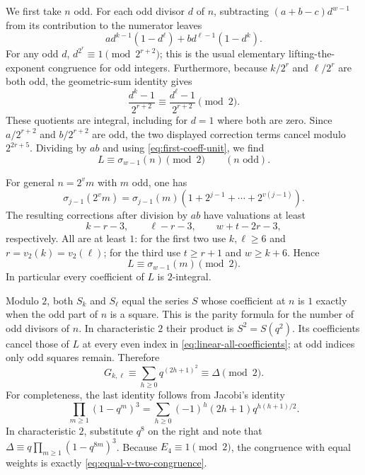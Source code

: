 \documentclass[11pt]{article}
\begin{document}
We first take $n$ odd.  For each odd divisor $d$ of $n$,
subtracting $(a+b-c)d^{w-1}$ from its contribution to the numerator
leaves
\[
 a d^{k-1}(1-d^\ell)+b d^{\ell-1}(1-d^k).
\]
For any odd $d$, $d^{2^r}\equiv1\pmod{2^{r+2}}$; this is the
usual elementary lifting-the-exponent congruence for odd integers.
Furthermore, because $k/2^r$ and $\ell/2^r$ are both odd, the
geometric-sum identity gives
\[
 \frac{d^k-1}{2^{r+2}}
 \equiv\frac{d^\ell-1}{2^{r+2}}\pmod2.
\]
These quotients are integral, including for $d=1$ where both are zero.
Since $a/2^{r+2}$ and $b/2^{r+2}$ are odd, the two displayed
correction terms cancel modulo $2^{2r+5}$.  Dividing by $ab$ and
using \eqref{eq:first-coeff-unit}, we find
\begin{equation}
 [q^n]L\equiv\sigma_{w-1}(n)\pmod2
 \qquad(n\text{ odd}).
 \label{eq:linear-odd-coefficients}
\end{equation}

For general $n=2^vm$ with $m$ odd, one has
\[
 \sigma_{j-1}(2^vm)=\sigma_{j-1}(m)
       (1+2^{j-1}+\cdots+2^{v(j-1)}).
\]
The resulting corrections after division by $ab$ have valuations
at least
\[
 k-r-3,\qquad \ell-r-3,\qquad w+t-2r-3,
\]
respectively.  All are at least $1$: for the first two use
$k,\ell\ge6$ and $r=v_2(k)=v_2(\ell)$; for the third use
$t\ge r+1$ and $w\ge k+6$.  Hence
\begin{equation}
 [q^n]L\equiv\sigma_{w-1}(m)\pmod2.
 \label{eq:linear-all-coefficients}
\end{equation}
In particular every coefficient of $L$ is $2$-integral.

Modulo $2$, both $S_k$ and $S_\ell$ equal the series $S$ whose
coefficient at $n$ is $1$ exactly when the odd part of $n$ is a square.
This is the parity formula for the number of odd divisors of $n$.
In characteristic $2$ their product is $S^2=S(q^2)$.  Its
coefficients cancel those of $L$ at every even index in
\eqref{eq:linear-all-coefficients}; at odd indices only odd squares
remain.  Therefore
\[
 G_{k,\ell}\equiv\sum_{h\ge0}q^{(2h+1)^2}\equiv\Delta\pmod2.
\]
For completeness, the last identity follows from Jacobi's identity
\[
 \prod_{m\ge1}(1-q^m)^3
 =\sum_{h\ge0}(-1)^h(2h+1)q^{h(h+1)/2}.
\]
In characteristic $2$, substitute $q^8$ on the right and note that
$\Delta\equiv q\prod_{m\ge1}(1-q^{8m})^3$.
Because $E_4\equiv1\pmod2$, the congruence with equal weights is
exactly \eqref{eq:equal-v-two-congruence}.
\end{document}
